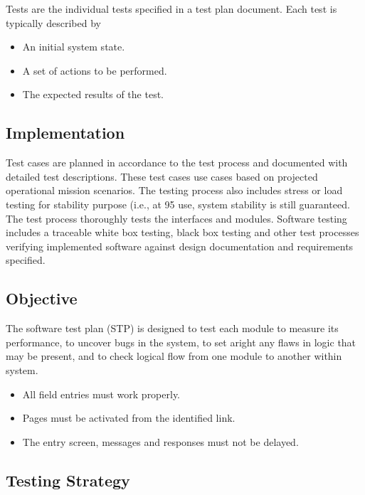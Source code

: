 \documentclass[12pt]{report}
\begin{document}
Tests are the individual tests specified in a test plan document. Each test is typically 
described by
\begin{itemize}
\item An initial system state.
\item A set of actions to be performed.
\item The expected results of the test.
\end{itemize}

\subsection{ Implementation}
\justifying
\setlength{\parindent}{4em}
\setlength{\parskip}{0.5em}
\renewcommand{\baselinestretch}{1.5}
\normalsize

Test cases are planned in accordance to the test process and documented with detailed test 
descriptions. These test cases use cases based on projected operational mission scenarios. 
The testing process also includes stress or load testing for stability purpose (i.e., at 95%
use, system stability is still guaranteed. The test process thoroughly tests the interfaces and 
modules. Software testing includes a traceable white box testing, black box testing and other 
test processes verifying implemented software against design documentation and 
requirements specified.


\subsection{Objective
}
\justifying
\setlength{\parindent}{4em}
\setlength{\parskip}{0.5em}
\renewcommand{\baselinestretch}{1.5}
\normalsize

The software test plan (STP) is designed to test each module to measure its performance, to 
uncover bugs in the system, to set aright any flaws in logic that may be present, and to check 
logical flow from one module to another within system.
\begin{itemize}
\item All field entries must work properly.
\item Pages must be activated from the identified link.
\item The entry screen, messages and responses must not be delayed.

\end {itemize}


\subsection{Testing Strategy
}
\justifying
\setlength{\parindent}{4em}
\setlength{\parskip}{0.5em}
\renewcommand{\baselinestretch}{1.5}
\normalsize
\end{document}
